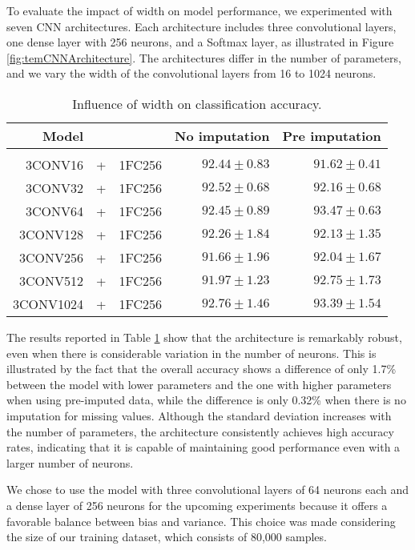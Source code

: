 To evaluate the impact of width on model performance, we experimented with seven CNN architectures.
Each architecture includes three convolutional layers, one dense layer with 256 neurons, and a Softmax layer, as illustrated in Figure \ref{fig:temCNNArchitecture}.
The architectures differ in the number of parameters, and we vary the width of the convolutional layers from 16 to 1024 neurons.

 \begin{table}[H]
  \centering
   \begin{tabular}{rclrr}
   Model&&                  & No imputation         & Pre imputation             \\[0.2cm]
   \hline \\[-0.2cm]
   3CONV16 &+& 1FC256    	 & $92.44 \pm 0.83$ 	 & $91.62 \pm 0.41$\\
   3CONV32 &+& 1FC256    	 & $92.52 \pm 0.68$ 	 & $92.16 \pm 0.68$\\
   3CONV64 &+& 1FC256    	 & $92.45 \pm 0.89$ 	 & $\mathbf{93.47 \pm 0.63}$\\
   3CONV128 &+& 1FC256   	 & $92.26 \pm 1.84$ 	 & $92.13 \pm 1.35$\\
   3CONV256 &+& 1FC256   	 & $91.66 \pm 1.96$ 	 & $92.04 \pm 1.67$\\
   3CONV512 &+& 1FC256   	 & $91.97 \pm 1.23$ 	 & $92.75 \pm 1.73$\\
   3CONV1024 &+& 1FC256  	 & $\mathbf{92.76 \pm 1.46}$ 	 & $93.39 \pm 1.54$\\
   \end{tabular}
   \caption{Influence of width on classification accuracy.}
   \label{tab:temCNNwidth}
 \end{table}

The results reported in Table \ref{tab:temCNNwidth} show that the architecture is remarkably robust, even when there is considerable variation in the number of neurons.
This is illustrated by the fact that the overall accuracy shows a difference of only 1.7\% between the model with lower parameters and the one with higher parameters when using pre-imputed data, while the difference is only 0.32\% when there is no imputation for missing values.
Although the standard deviation increases with the number of parameters, the architecture consistently achieves high accuracy rates, indicating that it is capable of maintaining good performance even with a larger number of neurons.

We chose to use the model with three convolutional layers of 64 neurons each and a dense layer of 256 neurons for the upcoming experiments because it offers a favorable balance between bias and variance.
This choice was made considering the size of our training dataset, which consists of 80,000 samples.

